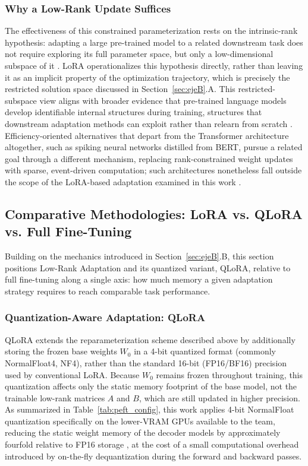 \documentclass[conference]{IEEEtran}
\begin{document}
\subsubsection{Why a Low-Rank Update Suffices}
The effectiveness of this constrained parameterization rests on the intrinsic-rank hypothesis: adapting a large pre-trained model to a related downstream task does not require exploring its full parameter space, but only a low-dimensional subspace of it \cite{liu-etal-2026-look}. LoRA operationalizes this hypothesis directly, rather than leaving it as an implicit property of the optimization trajectory, which is precisely the restricted solution space discussed in Section~\ref{sec:ejeB}.A. This restricted-subspace view aligns with broader evidence that pre-trained language models develop identifiable internal structures during training, structures that downstream adaptation methods can exploit rather than relearn from scratch \cite{teehan2022emergent}. Efficiency-oriented alternatives that depart from the Transformer architecture altogether, such as spiking neural networks distilled from BERT, pursue a related goal through a different mechanism, replacing rank-constrained weight updates with sparse, event-driven computation; such architectures nonetheless fall outside the scope of the LoRA-based adaptation examined in this work \cite{lv2026spikebert}.

\subsection{Comparative Methodologies: LoRA vs. QLoRA vs. Full Fine-Tuning}

Building on the mechanics introduced in Section~\ref{sec:ejeB}.B, this section positions Low-Rank Adaptation and its quantized variant, QLoRA, relative to full fine-tuning along a single axis: how much memory a given adaptation strategy requires to reach comparable task performance.

\subsubsection{Quantization-Aware Adaptation: QLoRA}
QLoRA extends the reparameterization scheme described above by additionally storing the frozen base weights $W_0$ in a 4-bit quantized format (commonly NormalFloat4, NF4), rather than the standard 16-bit (FP16/BF16) precision used by conventional LoRA. Because $W_0$ remains frozen throughout training, this quantization affects only the static memory footprint of the base model, not the trainable low-rank matrices $A$ and $B$, which are still updated in higher precision. As summarized in Table~\ref{tab:peft_config}, this work applies 4-bit NormalFloat quantization specifically on the lower-VRAM GPUs available to the team, reducing the static weight memory of the decoder models by approximately fourfold relative to FP16 storage \cite{wang2025peft}, at the cost of a small computational overhead introduced by on-the-fly dequantization during the forward and backward passes.
\end{document}
